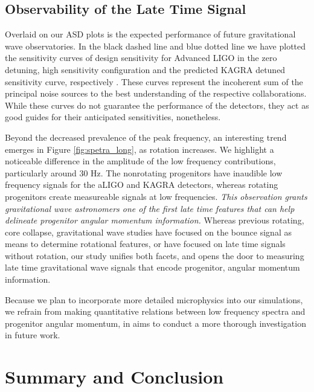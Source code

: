 \documentclass[twocolumn,times]{aastex62}  %
\begin{document}
\subsection{Observability of the Late Time Signal}

 Overlaid on our ASD plots is the expected performance of future gravitational wave observatories.  In the black dashed line and blue dotted line we have plotted the sensitivity curves of design sensitivity for Advanced LIGO in the zero detuning, high sensitivity configuration and the predicted KAGRA detuned sensitivity curve, respectively \citep{komari:2017,barsotti:2018}.
These curves represent the incoherent sum of the principal noise sources to the best understanding of the respective collaborations.  While these curves do not guarantee the performance of the detectors, they act as good guides for their anticipated sensitivities, nonetheless. 




Beyond the decreased prevalence of the peak frequency, an interesting trend emerges in Figure \ref{fig:spetra_long}, as rotation increases.  We highlight a noticeable difference in the amplitude of the low frequency contributions, particularly around 30 Hz.  The nonrotating progenitors have inaudible low frequency signals for the aLIGO and KAGRA detectors, whereas rotating progenitors create measureable signals at low frequencies.  \textit{This observation grants gravitational wave astronomers one of the first late time features that can help delineate progenitor angular momentum information.}  Whereas previous rotating, core collapse, gravitational wave studies have focused on the bounce signal as means to determine rotational features, or have focused on late time signals without rotation, our study unifies both facets, and opens the door to measuring late time gravitational wave signals that encode progenitor, angular momentum information. 

Because we plan to incorporate more detailed microphysics into our simulations, we refrain from making quantitative relations between low frequency spectra and progenitor angular momentum, in aims to conduct a more thorough investigation in future work.



\section{Summary and Conclusion}
\label{sec:summary}
\end{document}
